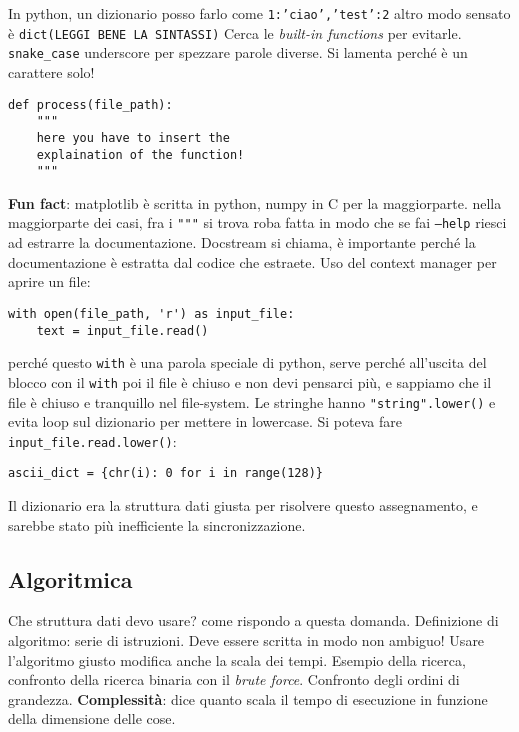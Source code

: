 \documentclass[10pt, a4paper, titlepage]{book}
\begin{document}
In python, un dizionario posso farlo come \texttt{{1:'ciao','test':2}}
altro modo sensato è \texttt{dict(LEGGI BENE LA SINTASSI)}
Cerca le \textit{built-in functions} per evitarle.
\texttt{snake\_case} underscore per spezzare parole diverse. Si lamenta perché è un carattere solo!
\begin{verbatim}
def process(file_path):
	"""
	here you have to insert the 
	explaination of the function!
	"""
\end{verbatim}

\textbf{Fun fact}: matplotlib è scritta in python, numpy in C per la maggiorparte.
nella maggiorparte dei casi, fra i \texttt{"""} si trova roba fatta in modo che se fai \texttt{--help} riesci ad estrarre la documentazione.
Docstream si chiama, è importante perché la documentazione è estratta dal codice che estraete.
Uso del context manager per aprire un file:

\begin{verbatim}
with open(file_path, 'r') as input_file:
	text = input_file.read()	
\end{verbatim}

perché questo \texttt{with} è una parola speciale di python, serve perché all'uscita del blocco con il \texttt{with} poi il file è chiuso e non devi pensarci più, e sappiamo che il file è chiuso e tranquillo nel file-system.
Le stringhe hanno \texttt{"string".lower()} e evita loop sul dizionario per mettere in lowercase.
Si poteva fare \texttt{input_file.read.lower()}:
\begin{verbatim}
ascii_dict = {chr(i): 0 for i in range(128)}
\end{verbatim}

Il dizionario era la struttura dati giusta per risolvere questo assegnamento, e sarebbe stato più inefficiente la sincronizzazione.

\subsection{Algoritmica}

Che struttura dati devo usare? come rispondo a questa domanda.
Definizione di algoritmo: serie di istruzioni. Deve essere scritta in modo non ambiguo! Usare l'algoritmo giusto modifica anche la scala dei tempi.
Esempio della ricerca, confronto della ricerca binaria con il \textit{brute force}.
Confronto degli ordini di grandezza.
\textbf{Complessità}: dice quanto scala il tempo di esecuzione in funzione della dimensione delle cose.
\end{document}
